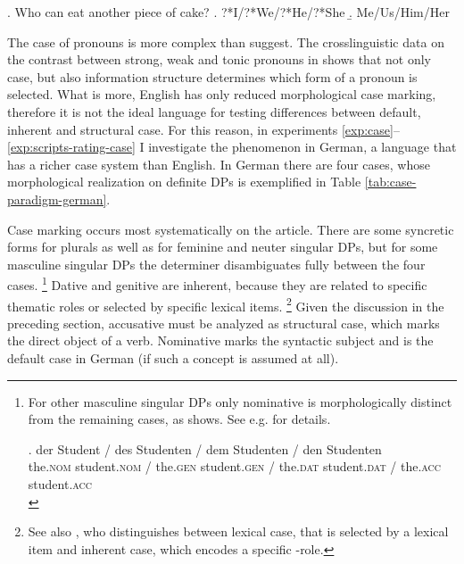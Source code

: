 \ex. Who can eat another piece of cake? \hfill \citep[77]{barton.progovac2005} 
\a. ?*I/?*We/?*He/?*She
\b. Me/Us/Him/Her

The case of pronouns is more complex than \citet{barton.progovac2005} suggest. The crosslinguistic data on the contrast between strong, weak and tonic pronouns in \citet{merchant2004} shows that not only case, but also information structure determines which form of a pronoun is selected. What is more, English has only reduced morphological case marking, therefore it is not the ideal language for testing differences between default, inherent and structural case. For this reason, in experiments \ref{exp:case}--\ref{exp:scripts-rating-case} I investigate the phenomenon in German, a language that has a richer case system than English. In German there are four cases, whose morphological realization on definite DPs is exemplified in Table \ref{tab:case-paradigm-german}.

\largerpage
Case marking occurs most systematically on the article. There are some syncretic forms for plurals as well as for feminine and neuter singular DPs, but for some masculine singular DPs the determiner disambiguates fully between the four cases.%
%
\footnote{For other masculine singular DPs only nominative is morphologically distinct from the remaining cases, as \Next shows. See e.g. \citet[139--141]{eisenberg1999} for details.

\exg. der Student / des Studenten / dem Studenten /  den Studenten\\
      the.\textsc{nom} student.\textsc{nom} /  the.\textsc{gen} student.\textsc{gen} / the.\textsc{dat} student.\textsc{dat} /  the.\textsc{acc} student.\textsc{acc}\\


}\afterfn%
%
Dative and genitive are inherent, because they are related to specific thematic roles or selected by specific lexical items.%
%
\footnote{See also \citet{woolford2006}, who distinguishes between lexical case, that is selected by a lexical item and inherent case, which encodes a specific \texttheta-role.}\afterfn%
% 
Given the discussion in the preceding section, accusative must be analyzed as structural case, which marks the direct object of a verb. Nominative marks the syntactic subject and is the default case in German (if such a concept is assumed at all).

